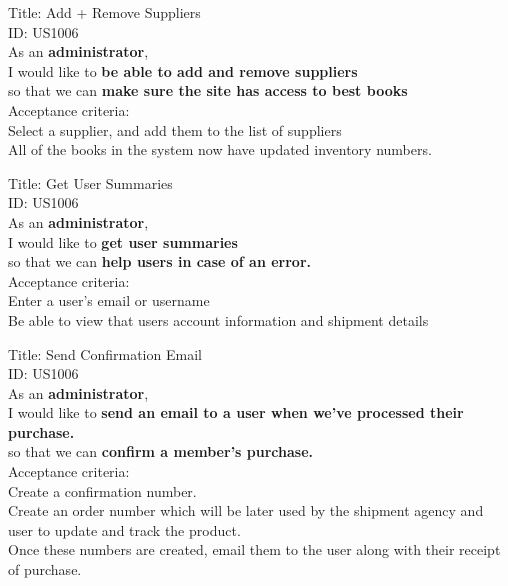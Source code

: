 \documentclass{article}
\begin{document}
\begin{framed}
\noindent
Title: Add + Remove Suppliers \\
ID: US1006 \\
As an \textbf{administrator},\\
 \textbullet  \quad \quad I would like to \textbf{be able to add and remove suppliers}\\ 
 \textbullet  \quad \quad so that we can \textbf{make sure the site has access to best books}\\
 Acceptance criteria: \\
  \textbullet  \quad \quad Select a supplier, and add them to the list of suppliers\\
  \textbullet  \quad \quad All of the books in the system now have updated inventory numbers.
\end{framed}


\begin{framed}
\noindent
Title: Get User Summaries \\
ID: US1006 \\
As an \textbf{administrator},\\
 \textbullet  \quad \quad I would like to \textbf{get user summaries}\\ 
 \textbullet  \quad \quad so that we can \textbf{help users in case of an error.}\\
 Acceptance criteria: \\
  \textbullet  \quad \quad Enter a user's email or username\\
  \textbullet  \quad \quad Be able to view that users account information and shipment details
\end{framed}

\begin{framed}
\noindent
Title: Send Confirmation Email \\
ID: US1006 \\
As an \textbf{administrator},\\
 \textbullet  \quad \quad I would like to \textbf{send an email to a user when we've processed their purchase.}\\ 
 \textbullet  \quad \quad so that we can \textbf{confirm a member's purchase.}\\
 Acceptance criteria: \\
  \textbullet  \quad \quad Create a confirmation number.\\
  \textbullet  \quad \quad Create an order number which will be later used by the shipment agency and user to update and track the product.\\
  \textbullet  \quad \quad Once these numbers are created, email them to the user along with their receipt of purchase.
\end{framed}
\end{document}
